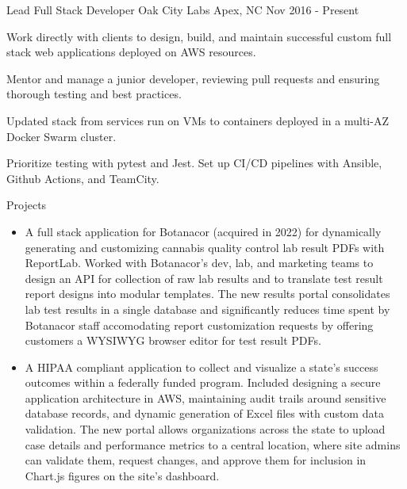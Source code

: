 

\begin{cventries}

  \cventry
    {Lead Full Stack Developer} %
    {Oak City Labs} %
    {Apex, NC} %
    {Nov 2016 - Present} %
    {
      \begin{cvitems} %
        \item {Work directly with clients to design, build, and maintain successful custom full stack web applications deployed on AWS resources.}
        \item {Mentor and manage a junior developer, reviewing pull requests and ensuring thorough testing and best practices.}
        \item {Updated stack from services run on VMs to containers deployed in a multi-AZ Docker Swarm cluster.}
        \item {Prioritize testing with pytest and Jest. Set up CI/CD pipelines with Ansible, Github Actions, and TeamCity.}
        \item {Projects
          \begin{itemize}[leftmargin=2ex, nosep, noitemsep]
          \setlength{\parskip}{0pt}
            \item {A full stack application for Botanacor (acquired in 2022) for dynamically generating and customizing cannabis quality control lab result PDFs with ReportLab. Worked with Botanacor's dev, lab, and marketing teams to design an API for collection of raw lab results and to translate test result report designs into modular templates. The new results portal consolidates lab test results in a single database and significantly reduces time spent by Botanacor staff accomodating report customization requests by offering customers a WYSIWYG browser editor for test result PDFs.}
            \item {A HIPAA compliant application to collect and visualize a state's success outcomes within a federally funded program. Included designing a secure application architecture in AWS, maintaining audit trails around sensitive database records, and dynamic generation of Excel files with custom data validation. The new portal allows organizations across the state to upload case details and performance metrics to a central location, where site admins can validate them, request changes, and approve them for inclusion in Chart.js figures on the site's dashboard.}

\end{itemize}}
\end{cvitems}}
\end{cventries}
